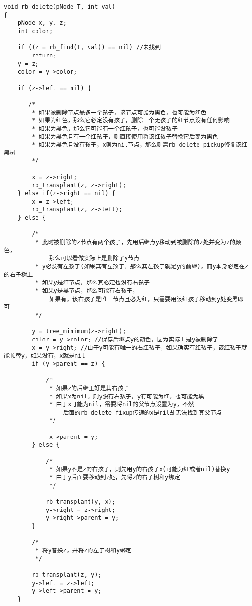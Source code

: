 \begin{verbatim}
void rb_delete(pNode T, int val)
{
    pNode x, y, z;
    int color;

    if ((z = rb_find(T, val)) == nil) //未找到
        return;
    y = z;
    color = y->color;

    if (z->left == nil) {

       /*
        * 如果被删除节点最多一个孩子，该节点可能为黑色，也可能为红色
        * 如果为红色，那么它必定没有孩子，删除一个无孩子的红节点没有任何影响
        * 如果为黑色，那么它可能有一个红孩子，也可能没孩子
        * 如果为黑色且有一个红孩子，则直接使用将该红孩子替换它后变为黑色
        * 如果为黑色且没有孩子，x则为nil节点，那么则需rb_delete_pickup修复该红黑树
        */

        x = z->right;
        rb_transplant(z, z->right);
    } else if(z->right == nil) {
        x = z->left;
        rb_transplant(z, z->left);
    } else {

        /*
         * 此时被删除的z节点有两个孩子，先用后继点y移动到被删除的z处并变为z的颜色，
             那么可以看做实际上是删除了y节点
         * y必没有左孩子(如果其有左孩子，那么其左孩子就是y的前继)，而y本身必定在z的右子树上
         * 如果y是红节点，那么其必定也没有右孩子
         * 如果y是黑节点，那么可能有右孩子，
             如果有，该右孩子是唯一节点且必为红，只需要用该红孩子移动到y处变黑即可
         */

        y = tree_minimum(z->right);
        color = y->color; //保存后继点y的颜色，因为实际上是y被删除了
        x = y->right; //由于y可能有唯一的右红孩子，如果确实有红孩子，该红孩子就能顶替y，如果没有，x就是nil
        if (y->parent == z) {

            /*
             * 如果z的后继正好是其右孩子
             * 如果x为nil，则y没有右孩子，y有可能为红，也可能为黑
             * 由于x可能为nil，需要将nil的父节点设置为y，不然
                 后面的rb_delete_fixup传递的x是nil却无法找到其父节点
             */

             x->parent = y;
        } else {

            /*
             * 如果y不是z的右孩子，则先用y的右孩子x(可能为红或者nil)替换y
             * 由于y后面要移动到z处，先将z的右子树和y绑定
             */

            rb_transplant(y, x);
            y->right = z->right;
            y->right->parent = y;
        }

        /*
         * 将y替换z，并将z的左子树和y绑定
         */

        rb_transplant(z, y);
        y->left = z->left;
        y->left->parent = y;
    }


\end{verbatim}
